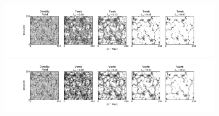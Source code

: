 \documentclass[usenatbib]{latex/mn2e}
\begin{document}
\begin{flushleft}
\begin{figure}
\begin{center}

  \includegraphics[trim = 40mm 12mm 37mm 10mm, clip, keepaspectratio=true,
  width=0.7\textheight]{./figures/cosmicweb_visual_Tweb.pdf}
  \includegraphics[trim = 40mm 12mm 37mm 10mm, clip, keepaspectratio=true,
  width=0.7\textheight]{./figures/cosmicweb_visual_Vweb.pdf}


  \label{fig:visual_impression}
  \vspace{0.1 cm}

\end{center}
\end{figure}
\end{flushleft}
\end{document}
